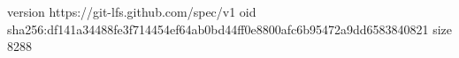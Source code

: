 version https://git-lfs.github.com/spec/v1
oid sha256:df141a34488fe3f714454ef64ab0bd44ff0e8800afc6b95472a9dd6583840821
size 8288
